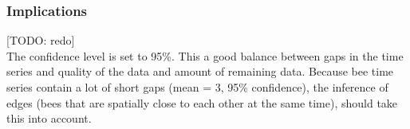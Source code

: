 

\subsubsection{Implications}
[TODO: redo]\\
The confidence level is set to 95\%.
This a good balance between gaps in the time series and quality of the data and amount of remaining data.
Because bee time series contain a lot of short gaps (mean = 3, 95\% confidence), the inference of edges (bees that are spatially close to each other at the same time), should take this into account.